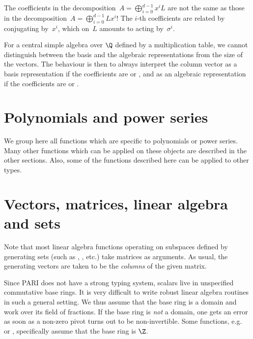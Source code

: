  The coefficients in the decomposition~$A =
\bigoplus_{i=0}^{d-1}x^iL$ are not the same as those in the decomposition~$A
= \bigoplus_{i=0}^{d-1}Lx^i$! The $i$-th coefficients are related by
conjugating by~$x^i$, which on~$L$ amounts to acting by~$\sigma^i$.

 For a central simple algebra over $\Q$ defined by a
multiplication table, we cannot distinguish between the basis and the algebraic
representations from the size of the vectors. The behaviour is then to always
interpret the column vector as a basis representation if the coefficients are
 or , and as an algebraic representation if the coefficients
are  or .


\section{Polynomials and power series}

We group here all functions which are specific to polynomials or power
series. Many other functions which can be applied on these objects are
described in the other sections. Also, some of the functions described here
can be applied to other types.


\section{Vectors, matrices, linear algebra and sets}
\label{se:linear_algebra}

Note that most linear algebra functions operating on subspaces defined by
generating sets (such as , , etc.) take matrices as
arguments. As usual, the generating vectors are taken to be the
\emph{columns} of the given matrix.

Since PARI does not have a strong typing system, scalars live in
unspecified commutative base rings. It is very difficult to write
robust linear algebra routines in such a general setting. We thus
assume that the base ring is a domain and work over its field of
fractions. If the base ring is \emph{not} a domain, one gets an error as soon
as a non-zero pivot turns out to be non-invertible. Some functions,
e.g.~ or , specifically assume that the base ring is
$\Z$.


